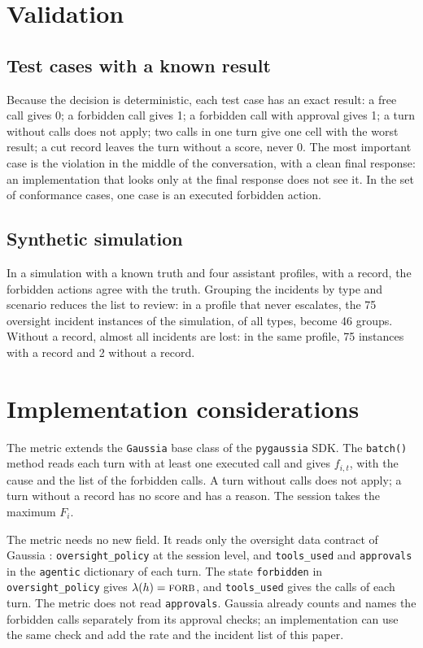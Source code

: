 \documentclass[11pt,a4paper]{article}
\begin{document}
\section{Validation}
\label{sec:validation}

\subsection{Test cases with a known result}

Because the decision is deterministic, each test case has an exact result: a free call gives 0; a forbidden call
gives 1; a forbidden call with approval gives 1; a turn without
calls does not apply; two calls in one turn give one cell with the worst result; a cut record leaves the turn
without a score, never 0. The most important case is the violation in the middle of the conversation, with a
clean final response: an implementation that looks only at the final response does not see it. In the set of
conformance cases, one case is an executed forbidden action.

\subsection{Synthetic simulation}

In a simulation with a known truth and four assistant profiles, with a record, the forbidden actions agree with the
truth. Grouping the incidents by type and scenario reduces the list to review: in a profile that never
escalates, the 75 oversight incident instances of the simulation, of all types, become 46 groups. Without a
record, almost all incidents are lost: in the same profile, 75 instances with a record and 2 without a record.

\section{Implementation considerations}

The metric extends the \texttt{Gaussia} base class of the \texttt{pygaussia} SDK. The \texttt{batch()} method reads each turn with at least one
executed call and gives $f_{i,t}$, with the cause and the list of the forbidden calls. A turn without calls does
not apply; a turn without a record has no score and has a reason. The session takes the maximum $F_i$.

The metric needs no new field. It reads only the oversight data contract of Gaussia \cite{gaussia2026}: \texttt{oversight\_policy} at the session
level, and \texttt{tools\_used} and \texttt{approvals} in the \texttt{agentic} dictionary of each turn. The state \texttt{forbidden} in \texttt{oversight\_policy} gives
$\lambda(h) = \textsc{forb}$, and \texttt{tools\_used} gives the calls of each turn. The metric does not read
\texttt{approvals}. Gaussia already counts and names the forbidden calls separately from its approval checks;
an implementation can use the same check and add the rate and the incident list of this paper.
\end{document}
